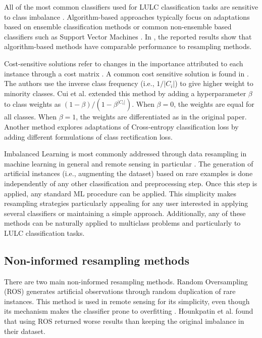 \documentclass[parskip=full]{scrartcl}
\begin{document}
All of the most common classifiers used for LULC classification tasks
\cite{Khatami2016, Gavade2019} are sensitive to class imbalance \cite{Blagus2010}.
Algorithm-based approaches typically focus on adaptations based on ensemble
classification methods \cite{Mellor2015} or common non-ensemble based
classifiers such as Support Vector Machines \cite{Shao2014}. In
\cite{Lee2016}, the reported results show that algorithm-based methods
have comparable performance to resampling methods.

Cost-sensitive solutions refer to changes in the importance attributed to each
instance through a cost matrix \cite{Huang2016,Cui2019,Dong2017}. A common cost sensitive
solution is found in \cite{Huang2016}. The authors use the inverse class
frequency (i.e., $1/|C_i|$) to give higher weight to minority
classes. Cui et al. \cite{Cui2019} extended this method by adding a
hyperparameter $\beta$ to class weights as
$(1-\beta)/(1-\beta^{|C_i|})$. When $\beta=0$, the weights are equal for
all classes. When $\beta=1$, the weights are differentiated as in
the original paper. Another method \cite{Dong2017} explores adaptations
of Cross-entropy classification loss by adding different formulations of class
rectification loss.

Imbalanced Learning is most commonly addressed through data resampling in
machine learning in general and remote sensing in particular
\cite{Feng2019}. The generation of artificial instances (i.e.,
augmenting the dataset) based on rare examples is done independently of any
other classification and preprocessing step. Once this step is applied, any
standard ML procedure can be applied. This simplicity makes resampling
strategies particularly appealing for any user interested in applying several
classifiers or maintaining a simple approach. Additionally, any of these
methods can be naturally applied to multiclass problems and particularly to
LULC classification tasks.

\subsection{Non-informed resampling methods}

There are two main non-informed resampling methods. Random Oversampling (ROS)
generates artificial observations through random duplication of rare instances.
This method is used in remote sensing \cite{Sharififar2019, Hounkpatin2018} for its
simplicity, even though its mechanism makes the classifier prone to overfitting
\cite{Krawczyk2016}. Hounkpatin et al. \cite{Hounkpatin2018} found that
using ROS returned worse results than keeping the original imbalance in their
dataset.
\end{document}
